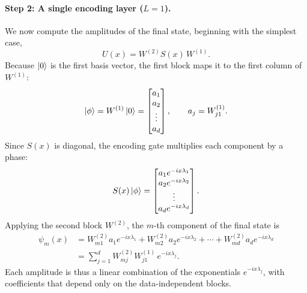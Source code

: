 \documentclass[12pt]{article}
\numberwithin{equation}{section}  %
\begin{document}
\paragraph{Step 2: A single encoding layer ($L=1$).} We now compute the amplitudes of the final state, beginning with the simplest case,
\begin{equation}
U(x) = W^{(2)} S(x)\, W^{(1)}.
\end{equation}
Because $\ket{0}$ is the first basis vector, the first block maps it to the first column of $W^{(1)}$:
\begin{equation}
\ket{\phi} = W^{(1)}\ket{0} = \begin{bmatrix} a_1 \\ a_2 \\ \vdots \\ a_d \end{bmatrix}, \qquad a_j = W^{(1)}_{j1}.
\end{equation}
Since $S(x)$ is diagonal, the encoding gate multiplies each component by a phase:
\begin{equation}
S(x)\ket{\phi} = \begin{bmatrix} a_1 e^{-ix\lambda_1} \\ a_2 e^{-ix\lambda_2} \\ \vdots \\ a_d e^{-ix\lambda_d} \end{bmatrix}.
\end{equation}
Applying the second block $W^{(2)}$, the $m$-th component of the final state is
\begin{equation}
\begin{aligned}
\psi_m(x) &= W^{(2)}_{m1} a_1 e^{-ix\lambda_1} + W^{(2)}_{m2} a_2 e^{-ix\lambda_2} + \cdots + W^{(2)}_{md} a_d e^{-ix\lambda_d} \\
&= \sum_{j=1}^{d} W^{(2)}_{mj} W^{(1)}_{j1}\, e^{-ix\lambda_j}.
\end{aligned}
\end{equation}
Each amplitude is thus a linear combination of the exponentials $e^{-ix\lambda_j}$, with coefficients that depend only on the data-independent blocks.
\end{document}
